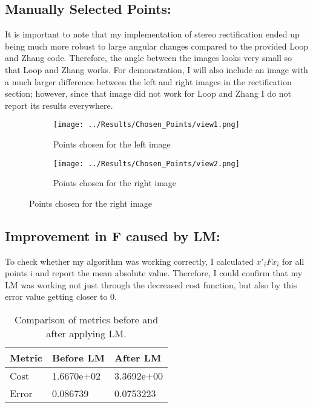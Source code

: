 \documentclass{article}
\begin{document}
\subsection{Manually Selected Points:}
It is important to note that my implementation of stereo rectification ended up being much more robust to large angular changes compared to the provided Loop and Zhang code. Therefore, the angle between the images looks very small so that Loop and Zhang works. For demonstration, I will also include an image with a much larger difference between the left and right images in the rectification section; however, since that image did not work for Loop and Zhang I do not report its results everywhere.
\begin{figure}[H]
    \centering
    \begin{subfigure}{0.49\linewidth}
        \centering
        \texttt{[image: ../Results/Chosen\_Points/view1.png]}
        \caption{Points chosen for the left image}
    \end{subfigure}
    \begin{subfigure}{0.49\linewidth}
        \centering
        \texttt{[image: ../Results/Chosen\_Points/view2.png]}
        \caption{Points chosen for the right image}
    \end{subfigure}
\end{figure}

\subsection{Improvement in F caused by LM:}
To check whether my algorithm was working correctly, I calculated $x'_i F x_i$ for all points i and report the mean absolute value. Therefore, I could confirm that my LM was working not just through the decreased cost function, but also by this error value getting closer to 0.
\begin{table}[H]
    \centering
    \begin{tabular}{@{}lll@{}}
        \toprule
        \textbf{Metric}      & \textbf{Before LM}  & \textbf{After LM}   \\ \midrule
        Cost                 & 1.6670e+02          & 3.3692e+00          \\
        Error                & 0.086739            & 0.0753223           \\ \bottomrule
    \end{tabular}
    \caption{Comparison of metrics before and after applying LM.}
    \label{tab:lm_metrics}
\end{table}
\end{document}
